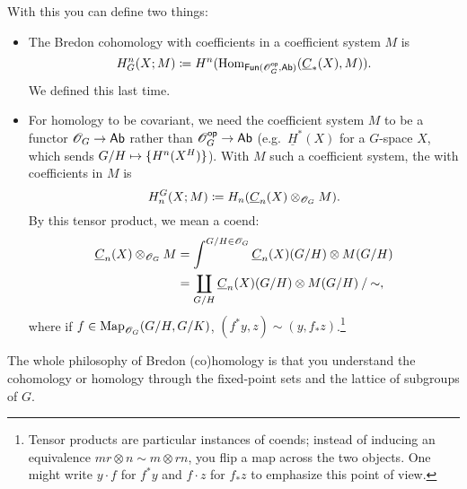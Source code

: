 With this you can define two things:
\begin{itemize}
	\item The Bredon cohomology with coefficients in a coefficient system $M$ is
	\[H_G^n(X;M) \coloneqq H^n(\operatorname{Hom}_{\mathsf{Fun}(\mathscr O_G^{\mathsf{op}}, \mathsf{Ab})}(\underline C_*(X), M)).\]
	We defined this last time.
	\item For homology to be covariant, we need the coefficient system $M$ to be a functor $\mathscr O_G\to\mathsf{Ab}$ rather
	than $\mathscr O_G^{\mathsf{op}}\to\mathsf{Ab}$ (e.g.\ $\underline H^*(X)$ for a $G$-space $X$, which sends $G/H\mapsto\set{H^n(X^H)}$).
	With $M$ such a coefficient system, the  with coefficients in $M$ is
	\[H_n^G(X; M) \coloneqq H_n(\underline C_n(X)\otimes_{\mathscr O_G} M).\]
	By this tensor product, we mean a coend:
	\begin{align*}
	\underline C_n(X)\otimes_{\mathscr O_G} M &= \int^{G/H\in \mathscr O_G} \underline C_n(X)(G/H)\otimes M(G/H)\\
	&= \coprod_{G/H} {\underline C_n(X)(G/H)\otimes M(G/H)} \mathbin/ {\mathord\sim},
	\end{align*}
	where if $f\in\operatorname{Map}_{\mathscr O_G}(G/H, G/K)$, $(f^*y, z)\sim (y, f_*z)$.\footnote{Tensor products are particular
	instances of coends; instead of inducing an equivalence $mr\otimes n\sim m\otimes rn$, you flip a map across
	the two objects. One might write $y\cdot f$ for $f^* y$ and $f\cdot z$ for $f_* z$ to emphasize this point of view.}
\end{itemize}
The whole philosophy of Bredon (co)homology is that you understand the cohomology or homology through the
fixed-point sets and the lattice of subgroups of $G$.
